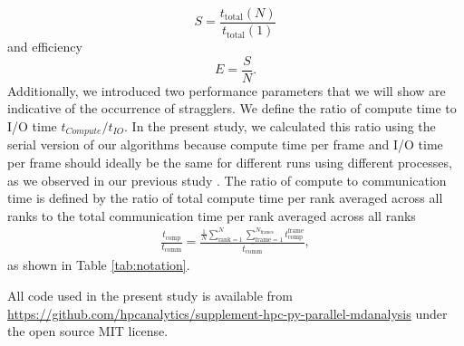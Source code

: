 \begin{equation}
  \label{eq:speedup}
  S = \frac{t_{\text{total}}(N)}{t_{\text{total}}(1)}
\end{equation}
and efficiency
\begin{equation}
  \label{eq:efficiency}
  E = \frac{S}{N}.
\end{equation}
Additionally, we introduced two performance parameters that we will show are indicative of the occurrence of stragglers.
We define the ratio of compute time to I/O time $t_{Compute}/t_{IO}$. 
In the present study, we calculated this ratio using the serial version of our algorithms because compute time per frame and I/O time per frame should ideally be the same for different runs using different processes, as we observed in our previous study \cite{Khoshlessan:2017ab}.
The ratio of compute to communication time is defined by the ratio of total compute time per rank averaged across all ranks to the total communication time per rank averaged across all ranks 
\begin{gather}
  \label{eq:Compute-comm}
  \frac{t_{\text{comp}}}{t_{\text{comm}}} = \frac{\frac{1}{N}
    \sum_{\text{rank}=1}^{N} \sum_{\text{frame}=1}^{N_{\text{frames}}}t_{\text{comp}}^{\text{frame}}}%
  {\overline{t_{\text{comm}}}},
\end{gather}
as shown in Table \ref{tab:notation}.
 
All code used in the present study is available from \url{https://github.com/hpcanalytics/supplement-hpc-py-parallel-mdanalysis} under the open source MIT license. 
 
